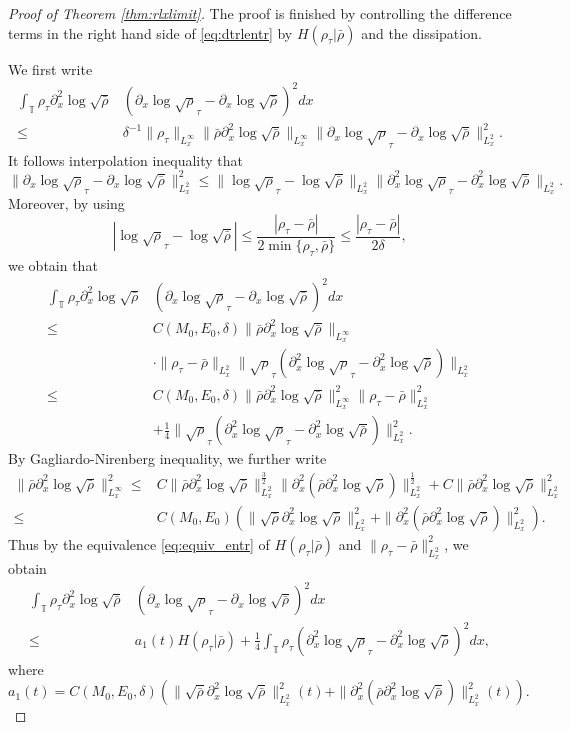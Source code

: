 \documentclass[leqno]{amsart}
\theoremstyle{plain}
\theoremstyle{definition}
\theoremstyle{remark}
\theoremstyle{plain}
\theoremstyle{plain}
\def\T{{\mathbb T}}%
\def\d{{\partial}}
\numberwithin{equation}{section}
\begin{document}
\begin{proof}[Proof of Theorem \ref{thm:rlxlimit}]
The proof is finished by controlling the difference terms in the right hand side of \eqref{eq:dtrlentr} by $H(\rho_\tau|\bar\rho)$ and the dissipation. 

We first write
\begin{align*}
\int_\T \rho_\tau\d_x^2\log\sqrt{\bar\rho}&(\d_x\log\sqrt\rho_\tau-\d_x\log\sqrt{\bar\rho})^2dx\\
\leq & \delta^{-1}\|\rho_\tau\|_{L^\infty_x}\|\bar\rho\d_x^2\log\sqrt{\bar\rho}\|_{L^\infty_x}\|\d_x\log\sqrt\rho_\tau-\d_x\log\sqrt{\bar\rho}\|^2_{L^2_x}.
\end{align*}
It follows interpolation inequality that
\begin{equation}\label{eq:bd_log1}
\|\d_x\log\sqrt\rho_\tau-\d_x\log\sqrt{\bar\rho}\|^2_{L^2_x}\leq \|\log\sqrt\rho_\tau-\log\sqrt{\bar\rho}\|_{L^2_x}\|\d_x^2\log\sqrt\rho_\tau-\d_x^2\log\sqrt{\bar\rho}\|_{L^2_x}.
\end{equation}
Moreover, by using
\begin{equation}\label{eq:bd_log2}
|\log\sqrt\rho_\tau-\log\sqrt{\bar\rho}|\leq \frac{|\rho_\tau-\bar\rho|}{2\min\{\rho_\tau,\bar\rho\}}\leq \frac{|\rho_\tau-\bar\rho|}{2\delta},
\end{equation}
we obtain that
\begin{align*}
\int_\T \rho_\tau\d_x^2\log\sqrt{\bar\rho}&(\d_x\log\sqrt\rho_\tau-\d_x\log\sqrt{\bar\rho})^2dx\\
\leq & C(M_0,E_0,\delta)\|\bar\rho\d_x^2\log\sqrt{\bar\rho}\|_{L^\infty_x}\\
&\cdot \|\rho_\tau-\bar\rho\|_{L^2_x}\|\sqrt\rho_\tau(\d_x^2\log\sqrt\rho_\tau-\d_x^2\log\sqrt{\bar\rho})\|_{L^2_x}\\
\leq & C(M_0,E_0,\delta)\|\bar\rho\d_x^2\log\sqrt{\bar\rho}\|_{L^\infty_x}^2 \|\rho_\tau-\bar\rho\|_{L^2_x}^2\\
&+\frac14\|\sqrt\rho_\tau(\d_x^2\log\sqrt\rho_\tau-\d_x^2\log\sqrt{\bar\rho})\|_{L^2_x}^2.
\end{align*}
By Gagliardo-Nirenberg  inequality, we further write
\begin{align*}
\|\bar\rho\d_x^2\log\sqrt{\bar\rho}\|_{L^\infty_x}^2\leq & C\|\bar\rho\d_x^2\log\sqrt{\bar\rho}\|_{L^2_x}^\frac32\|\d_x^2(\bar\rho\d_x^2\log\sqrt{\bar\rho})\|_{L^2_x}^\frac12+C\|\bar\rho\d_x^2\log\sqrt{\bar\rho}\|_{L^2_x}^2\\
\leq & C(M_0,E_0)(\|\sqrt{\bar\rho}\d_x^2\log\sqrt{\bar\rho}\|_{L^2_x}^2+\|\d_x^2(\bar\rho\d_x^2\log\sqrt{\bar\rho})\|_{L^2_x}^2).
\end{align*}
Thus by the equivalence \eqref{eq:equiv_entr} of $H(\rho_\tau|\bar\rho)$ and $\|\rho_\tau-\bar\rho\|_{L^2_x}^2$, we obtain
\begin{align*}
\int_\T \rho_\tau\d_x^2\log\sqrt{\bar\rho}&(\d_x\log\sqrt\rho_\tau-\d_x\log\sqrt{\bar\rho})^2dx\\
\leq & a_1(t)H(\rho_\tau|\bar\rho)+\frac14\int_\T\rho_\tau(\d_x^2\log\sqrt\rho_\tau-\d_x^2\log\sqrt{\bar\rho})^2 dx,
\end{align*}
where
\[
a_1(t)=C(M_0,E_0,\delta)(\|\sqrt{\bar\rho}\d_x^2\log\sqrt{\bar\rho}\|_{L^2_x}^2(t)+\|\d_x^2(\bar\rho\d_x^2\log\sqrt{\bar\rho})\|_{L^2_x}^2(t)).
\]


\end{proof}
\end{document}
